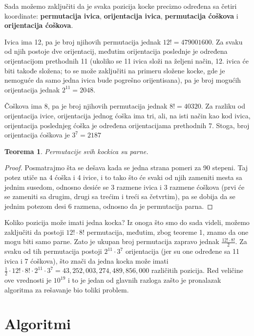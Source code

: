 \documentclass[a4paper]{article}
\newtheorem{teorema}{Teorema}
\begin{document}
Sada možemo zaključiti da je svaka pozicija kocke precizno određena sa četiri koordinate: \textbf{permutacija ivica}, \textbf{orijentacija ivica}, \textbf{permutacija ćoškova} i \textbf{orijentacija ćoškova}.

Ivica ima 12, pa je broj njihovih permutacija jednak $12! = 479 001 600$. Za svaku od njih postoje dve orijentacij, međutim orijentacija poslednje je određena orijentacijom prethodnih 11 (ukoliko se 11 ivica složi na željeni način, 12. ivica će biti takođe složena; to se može zaključiti na primeru složene kocke, gde je nemoguće da samo jedna ivica bude pogrešno orijentisana), pa je broj mogućih orijentacija jednak $2^{11} = 2048$.

Čoškova ima 8, pa je broj njihovih permutacija jednak $8! = 40320$. Za razliku od orijentacija ivice, orijentacija jednog ćoška ima tri, ali, na isti način kao kod ivica, orijentacija poslednjeg ćoška je određena orijentacijama prethodnih 7. Stoga, broj orijentacija ćoškova je $3^{7} = 2187$

\begin{teorema} Permutacije svih kockica su parne.
\end{teorema}
\begin{proof}
    Posmatrajmo šta se dešava kada se jedna strana pomeri za 90 stepeni. Taj potez utiče na 4 ćoška i 4 ivice, i to tako što će svaki od njih zameniti mesta sa jednim susedom, odnosno desiće se 3 razmene ivica i 3 razmene ćoškova (prvi će se zameniti sa drugim, drugi sa trećim i treći sa četvrtim), pa se dobija da se jednim potezom desi 6 razmena, odnosno da je permutacija parna.
\end{proof}

Koliko pozicija može imati jedna kocka? Iz onoga što smo do sada videli, možemo zaključiti da postoji $12! \cdot 8!$ permutacija, međutim, zbog teoreme 1, znamo da one mogu biti samo parne. Zato je ukupan broj permutacija zapravo jednak $\frac{12! \cdot 8!}{2}$. Za svaku od tih permutacija postoji $2^{11} \cdot 3^{7}$ orijentacija (jer su one određene sa 11 ivica i 7 ćoškova), što znači da jedna kocka može imati $\frac{1}{2} \cdot 12! \cdot 8! \cdot 2^{11} \cdot 3^7 = 43,252,003,274,489,856,000$ različitih pozicija. Red veličine ove vrednosti je $10^{19}$ i to je jedan od glavnih razloga zašto je pronalazak algoritma za rešavanje bio toliki problem.




\section{Algoritmi}
\label{sec:algoritmi}
\end{document}
